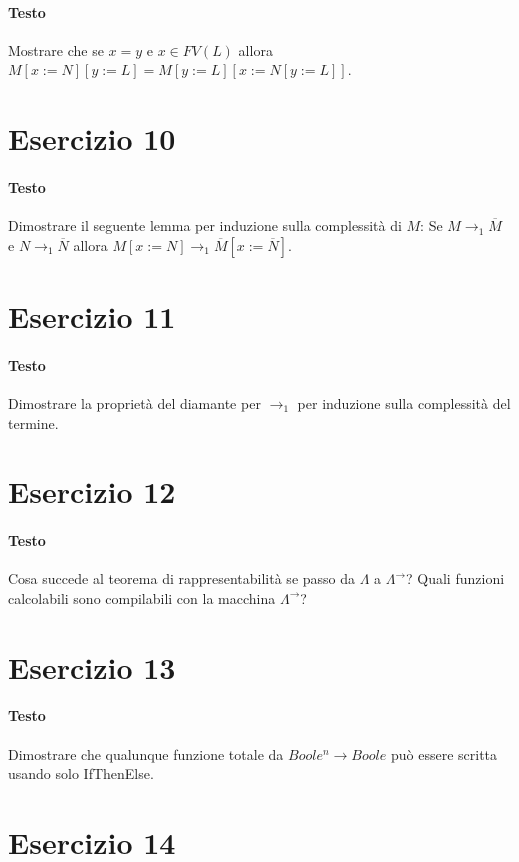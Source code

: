 \documentclass[a4paper,10pt]{article}
\begin{document}
\paragraph{Testo}
Mostrare che se $x = y$ e $x \in FV(L)$ allora $M [x := N ][y := L] = M [y := L][x :=N [y := L]]$.

\section*{Esercizio 10}
\paragraph{Testo}
Dimostrare il seguente lemma per induzione sulla complessità di $M$: Se $M \rightarrow_1 \overline{M}$ e $N \rightarrow_1 \overline{N}$ allora $M [x := N] \rightarrow_1 \overline{M} [x := \overline{N}]$.

\section*{Esercizio 11}
\paragraph{Testo}
Dimostrare la proprietà del diamante per $\rightarrow_1$ per induzione sulla complessità del termine.

\section*{Esercizio 12}
\paragraph{Testo}
Cosa succede al teorema di rappresentabilità se passo da $\Lambda$ a $\Lambda^\rightarrow$? Quali funzioni calcolabili sono compilabili con la macchina $\Lambda^\rightarrow$?

\section*{Esercizio 13}
\paragraph{Testo}
Dimostrare che qualunque funzione totale da $Boole^n \rightarrow Boole$ può essere scritta usando solo IfThenElse.

\section*{Esercizio 14}
\end{document}
